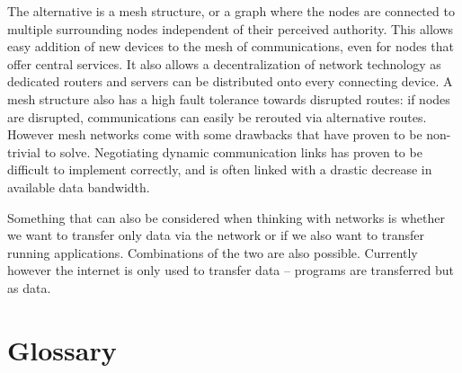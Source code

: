 \documentclass{acm_proc_article-sp}
\begin{document}
The alternative is a mesh structure, or a graph where the nodes are connected to multiple surrounding nodes independent of their perceived authority.
This allows easy addition of new devices to the mesh of communications, even for nodes that offer central services.
It also allows a decentralization of network technology as dedicated routers and servers can be distributed onto every connecting device.
A mesh structure also has a high fault tolerance towards disrupted routes: if nodes are disrupted, communications can easily be rerouted via alternative routes.
However mesh networks come with some drawbacks that have proven to be non-trivial to solve.
Negotiating dynamic communication links has proven to be difficult to implement correctly, and is often linked with a drastic decrease in available data bandwidth.

Something that can also be considered when thinking with networks is whether we want to transfer only data via the network or if we also want to transfer running applications.
Combinations of the two are also possible.
Currently however the internet is only used to transfer data – programs are transferred but as data.

\section{Glossary}


\balancecolumns
\end{document}
